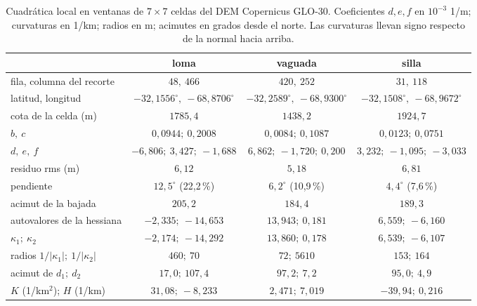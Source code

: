 \begin{table}[htbp]
\centering
\small
\caption{Cuadrática local en ventanas de \(7\times7\) celdas del DEM Copernicus GLO-30.
Coeficientes \(d,e,f\) en \(10^{-3}\) 1/m; curvaturas en 1/km; radios en m; acimutes en
grados desde el norte. Las curvaturas llevan signo respecto de la normal hacia arriba.}
\label{tab:curv-dem}
\begin{tabular}{lccc}
 & loma & vaguada & silla\\\hline
fila, columna del recorte & \(48,\ 466\) & \(420,\ 252\) & \(31,\ 118\)\\
latitud, longitud & \(-32{,}1556^\circ,\ -68{,}8706^\circ\) & \(-32{,}2589^\circ,\ -68{,}9300^\circ\) & \(-32{,}1508^\circ,\ -68{,}9672^\circ\)\\
cota de la celda (m) & \(1785{,}4\) & \(1438{,}2\) & \(1924{,}7\)\\
\(b,\ c\) & \(0{,}0944;\ 0{,}2008\) & \(0{,}0084;\ 0{,}1087\) & \(0{,}0123;\ 0{,}0751\)\\
\(d,\ e,\ f\) & \(-6{,}806;\ 3{,}427;\ -1{,}688\) & \(6{,}862;\ -1{,}720;\ 0{,}200\) & \(3{,}232;\ -1{,}095;\ -3{,}033\)\\
residuo rms (m) & \(6{,}12\) & \(5{,}18\) & \(6{,}81\)\\
pendiente & \(12{,}5^\circ\) (22{,}2\,\%) & \(6{,}2^\circ\) (10{,}9\,\%) & \(4{,}4^\circ\) (7{,}6\,\%)\\
acimut de la bajada & \(205{,}2\) & \(184{,}4\) & \(189{,}3\)\\
autovalores de la hessiana & \(-2{,}335;\ -14{,}653\) & \(13{,}943;\ 0{,}181\) & \(6{,}559;\ -6{,}160\)\\
\(\kappa_1;\ \kappa_2\) & \(-2{,}174;\ -14{,}292\) & \(13{,}860;\ 0{,}178\) & \(6{,}539;\ -6{,}107\)\\
radios \(1/\lvert\kappa_1\rvert;\ 1/\lvert\kappa_2\rvert\) & \(460;\ 70\) & \(72;\ 5610\) & \(153;\ 164\)\\
acimut de \(d_1;\ d_2\) & \(17{,}0;\ 107{,}4\) & \(97{,}2;\ 7{,}2\) & \(95{,}0;\ 4{,}9\)\\
\(K\) (1/km\(^2\)); \(H\) (1/km) & \(31{,}08;\ -8{,}233\) & \(2{,}471;\ 7{,}019\) & \(-39{,}94;\ 0{,}216\)
\end{tabular}
\end{table}

